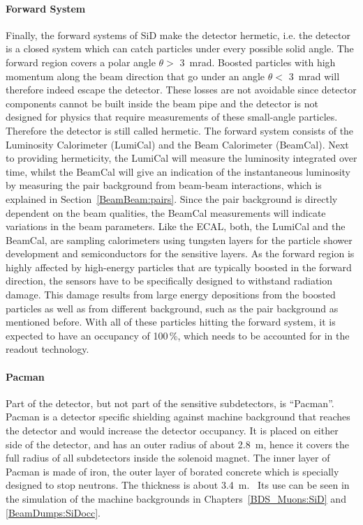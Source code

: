 \paragraph{Forward System}
Finally, the forward systems of SiD make the detector hermetic, i.e. the detector is a closed system which can catch particles under every possible solid angle.
The forward region covers a polar angle $\theta > $ \SI{3}{\milli\radian}.
Boosted particles with high momentum along the beam direction that go under an angle $\theta < $ \SI{3}{\milli\radian} will therefore indeed escape the detector.
These losses are not avoidable since detector components cannot be built inside the beam pipe and the detector is not designed for physics that require measurements of these small-angle particles.
Therefore the detector is still called hermetic.
The forward system consists of the Luminosity Calorimeter (LumiCal) and the Beam Calorimeter (BeamCal).
Next to providing hermeticity, the LumiCal will measure the luminosity integrated over time, whilst the BeamCal will give an indication of the instantaneous luminosity by measuring the \positron \electron pair background from beam-beam interactions, which is explained in Section~\ref{BeamBeam:pairs}.
Since the pair background is directly dependent on the beam qualities, the BeamCal measurements will indicate variations in the beam parameters.
Like the ECAL, both, the LumiCal and the BeamCal, are sampling calorimeters using tungsten layers for the particle shower development and semiconductors for the sensitive layers.
As the forward region is highly affected by high-energy particles that are typically boosted in the forward direction, the sensors have to be specifically designed to withstand radiation damage.
This damage results from large energy depositions from the boosted particles as well as from different background, such as the pair background as mentioned before.
With all of these particles hitting the forward system, it is expected to have an occupancy of 100\,\%, which needs to be accounted for in the readout technology.~\cite[p. 133ff]{TDR4}
\paragraph{Pacman}
Part of the detector, but not part of the sensitive subdetectors, is ``Pacman''.
Pacman is a detector specific shielding against machine background that reaches the detector and would increase the detector occupancy.
It is placed on either side of the detector, and has an outer radius of about \SI{2.8}{\meter}, hence it covers the full radius of all subdetectors inside the solenoid magnet.
The inner layer of Pacman is made of iron, the outer layer of borated concrete which is specially designed to stop neutrons.
The thickness is about \SI{3.4}{\meter}.~\cite{SiD_Geo}
Its use can be seen in the simulation of the machine backgrounds in Chapters~\ref{BDS_Muons:SiD} and \ref{BeamDumps:SiDocc}.


